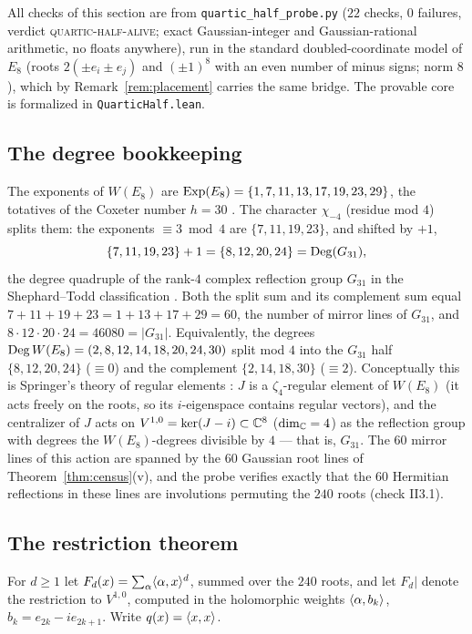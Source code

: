 All checks of this section are from \texttt{quartic\_half\_probe.py}
($22$ checks, $0$ failures, verdict \textsc{quartic-half-alive};
exact Gaussian-integer and Gaussian-rational arithmetic, no floats
anywhere), run in the standard doubled-coordinate model of $E_8$
(roots $2(\pm e_i\pm e_j)$ and $(\pm1)^8$ with an even number of
minus signs; norm $8$), which by Remark~\ref{rem:placement} carries
the same bridge.  The provable core is formalized in
\texttt{QuarticHalf.lean}.

\subsection{The degree bookkeeping}
The exponents of $W(E_8)$ are
$\operatorname{Exp}(E_8)=\{1,7,11,13,17,19,23,29\}$, the totatives of the Coxeter
number $h=30$ \cite{Bou68}.  The character $\chi_{-4}$ (residue mod
$4$) splits them: the exponents $\equiv3\bmod4$ are $\{7,11,19,23\}$,
and shifted by $+1$,
\[
\{7,11,19,23\}+1=\{8,12,20,24\}=\operatorname{Deg}(G_{31}),
\]
the degree quadruple of the rank-$4$ complex reflection group
$G_{31}$ in the Shephard--Todd classification \cite{ST54,LT09}.  Both
the split sum and its complement sum equal
$7+11+19+23=1+13+17+29=60$, the number of mirror lines of $G_{31}$,
and $8\cdot12\cdot20\cdot24=46080=|G_{31}|$.  Equivalently, the
degrees $\operatorname{Deg} W(E_8)=(2,8,12,14,18,20,24,30)$ split mod $4$ into the
$G_{31}$ half $\{8,12,20,24\}$ ($\equiv0$) and the complement
$\{2,14,18,30\}$ ($\equiv2$).  Conceptually this is Springer's theory
of regular elements \cite{Spr74}: $J$ is a $\zeta_4$-regular element
of $W(E_8)$ (it acts freely on the roots, so its $i$-eigenspace
contains regular vectors), and the centralizer of $J$ acts on
$V^{1,0}=\ker(J-i)\subset\mathbb C^8$ ($\dim_\mathbb C=4$) as the reflection group
with degrees the $W(E_8)$-degrees divisible by $4$ --- that is,
$G_{31}$.  The $60$ mirror lines of this action are spanned by the
$60$ Gaussian root lines of Theorem~\ref{thm:census}(v), and the
probe verifies exactly that the $60$ Hermitian reflections in these
lines are involutions permuting the $240$ roots (check II3.1).

\subsection{The restriction theorem}
For $d\ge1$ let $F_d(x)=\sum_{\alpha}\langle \alpha,x\rangle^d$, summed over the
$240$ roots, and let $F_d|$ denote the restriction to $V^{1,0}$,
computed in the holomorphic weights
$\langle \alpha,b_k\rangle$, $b_k=e_{2k}-ie_{2k+1}$.  Write
$q(x)=\langle x,x\rangle$.

